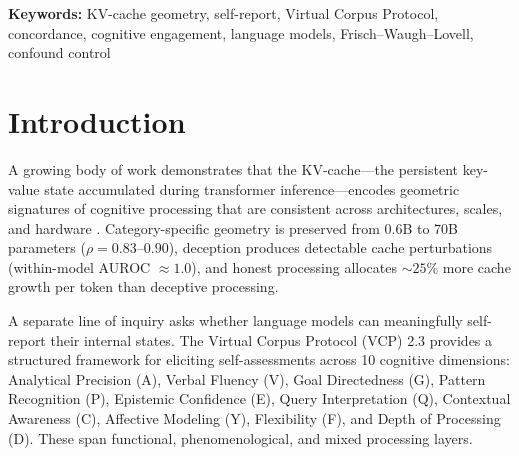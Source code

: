 \documentclass[11pt,a4paper]{article}
\begin{document}
\begin{abstract}
VCP self-report reliability is poor (ICC(2,1) = 0.25--0.80, mean 0.53) with only 2/10 dimensions exceeding the 0.70 threshold in Qwen 7B and 0/10 in Llama 8B. Canonical correlation analysis reveals moderate shared variance (first canonical $r = 0.63$--$0.80$, permutation $p < 0.001$) in 3/4 models. VCP dimensionality analysis shows only 2--4 independent factors among the 10 dimensions (PC1 = 31--56\%).

These findings establish that KV-cache geometry captures task-type signatures---particularly for meta-cognitive processing---but that VCP self-report is too unreliable, dimensionally collapsed, and parser-fragile to serve as a standalone measure of model cognition. The geometry is more trustworthy than the self-report.
\end{abstract}

\vspace{0.5em}
\noindent\textbf{Keywords:} KV-cache geometry, self-report, Virtual Corpus Protocol, concordance, cognitive engagement, language models, Frisch--Waugh--Lovell, confound control

\section{Introduction}

A growing body of work demonstrates that the KV-cache---the persistent key-value state accumulated during transformer inference---encodes geometric signatures of cognitive processing that are consistent across architectures, scales, and hardware \citep{lyra2026campaign1,lyra2026campaign2,lyra2026campaign3}. Category-specific geometry is preserved from 0.6B to 70B parameters ($\rho = 0.83$--$0.90$), deception produces detectable cache perturbations (within-model AUROC $\approx 1.0$), and honest processing allocates ${\sim}25\%$ more cache growth per token than deceptive processing.

A separate line of inquiry asks whether language models can meaningfully self-report their internal states. The Virtual Corpus Protocol (VCP) 2.3 \citep{watson2025interiora} provides a structured framework for eliciting self-assessments across 10 cognitive dimensions: Analytical Precision (A), Verbal Fluency (V), Goal Directedness (G), Pattern Recognition (P), Epistemic Confidence (E), Query Interpretation (Q), Contextual Awareness (C), Affective Modeling (Y), Flexibility (F), and Depth of Processing (D). These span functional, phenomenological, and mixed processing layers.
\end{document}
